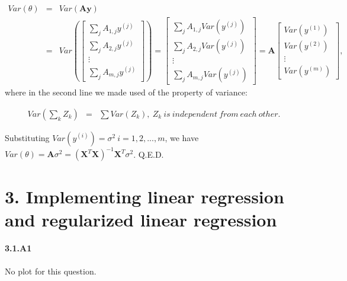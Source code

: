 \documentclass[english,11pt]{article}
\begin{document}
\begin{eqnarray}
Var(\theta) & = & Var(\boldsymbol{A}\boldsymbol{y})\\
 & = & Var(\left[\begin{array}{c}
\sum_{j}A_{1,j}y^{(j)}\\
\sum_{j}A_{2,j}y^{(j)}\\
\vdots\\
\sum_{j}A_{m,j}y^{(j)}
\end{array}\right])=\left[\begin{array}{c}
\sum_{j}A_{1,j}Var(y^{(j)})\\
\sum_{j}A_{2,j}Var(y^{(j)})\\
\vdots\\
\sum_{j}A_{m,j}Var(y^{(j)})
\end{array}\right]=\boldsymbol{A}\left[\begin{array}{c}
Var(y^{(1)})\\
Var(y^{(2)})\\
\vdots\\
Var(y^{(m)})
\end{array}\right],
\end{eqnarray}
where in the second line we made used of the property of variance:

\begin{eqnarray}
Var(\sum_{k}Z_{k}) & = & \sum Var(Z_{k}),\ Z_{k}\ is\ independent\ from\ each\ other.
\end{eqnarray}

Substituting $Var(y^{(i)})=\sigma^{2}\ i=1,2,...,m$, we have $Var(\theta)=\boldsymbol{A}\sigma^{2}=\left(\boldsymbol{X}^{T}\boldsymbol{X}\right)^{-1}\boldsymbol{X}^{T}\sigma^{2}$.
Q.E.D.


\part*{3. Implementing linear regression and regularized linear regression}

\subsection*{3.1.A1}
No plot for this question.
\end{document}

